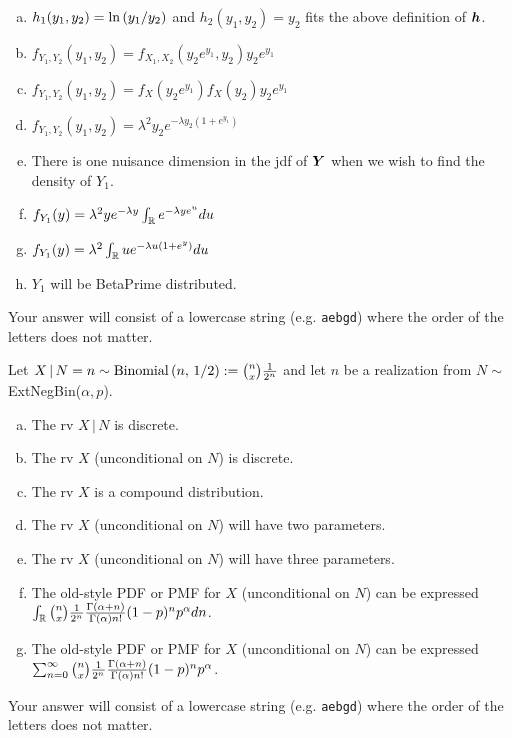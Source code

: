\documentclass[12pt,landscape]{article}
\newcommand{\instr}{\small Your answer will consist of a lowercase string (e.g. \texttt{aebgd}) where the order of the letters does not matter. \normalsize}
\begin{document}
\begin{enumerate}[(a)]
\item $h_1(y_1, y_2) = \ln\left(y_1 / y_2\right)$ and $h_2(y_1, y_2) = y_2$ fits the above definition of $\boldsymbol{h}$.
\item $f_{Y_1, Y_2}(y_1, y_2) = f_{X_1, X_2}(y_2 e^{y_1}, y_2) y_2e^{y_1}$ 
\item $f_{Y_1, Y_2}(y_1, y_2) = f_{X}(y_2 e^{y_1})f_X(y_2) y_2e^{y_1}$ 
\item $f_{Y_1, Y_2}(y_1, y_2) = \lambda^2 y_2 e^{-\lambda y_2(1+e^{y_1})}$
\item There is one nuisance dimension in the jdf of $\boldsymbol{Y}$ when we wish to find the density of $Y_1$. 
\item $f_{Y_1}(y) = \lambda^2 ye^{-\lambda y} \int_{\mathbb{R}} e^{-\lambda y e^{u} } du$ 
\item $f_{Y_1}(y) = \lambda^2 \int_{\mathbb{R}} u e^{-\lambda u(1+e^{y})} du$ 
\item $Y_1$ will be BetaPrime distributed.
\end{enumerate}
\eenum\instr\pagebreak


\problem{} Let $X\,|\,N=n \sim \mathrm{Binomial}\left(n,\,1/2\right) := \binom{n}{x} \frac{1}{2^n}$ and let $n$ be a realization from $N \sim$ ExtNegBin($\alpha, p$).

\vspace{-0.2cm}\benum{} 

\begin{enumerate}[(a)]
\item The rv $X\,|\,N$ is discrete.
\item The rv $X$ (unconditional on $N$) is discrete.
\item The rv $X$ is a compound distribution.
\item The rv $X$ (unconditional on $N$) will have two parameters.
\item The rv $X$ (unconditional on $N$) will have three parameters.
\item The old-style PDF or PMF for $X$ (unconditional on $N$) can be expressed $\int_{\mathbb{R}} \binom{n}{x} \frac{1}{2^n}   \frac{\Gamma\left(\alpha + n\right)}{\Gamma\left(\alpha\right) n!} (1-p)^n p^\alpha dn$.
\item The old-style PDF or PMF for $X$ (unconditional on $N$) can be expressed $\sum_{n=0}^\infty \binom{n}{x} \frac{1}{2^n} \frac{\Gamma\left(\alpha + n\right)}{\Gamma\left(\alpha\right) n!} (1-p)^n p^\alpha$.
\end{enumerate}
\eenum\instr\pagebreak

\end{document}
